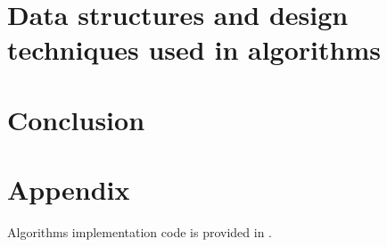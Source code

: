 \documentclass[12pt, bachelor, substylefile = algo_title.rtx]{disser}
\theoremstyle{definition}
\begin{document}
\section{Data structures and design techniques used in algorithms}




\section{Conclusion}

\section{Appendix}
Algorithms implementation code is provided in \cite{repogithub}.

{\small }

\end{document}
